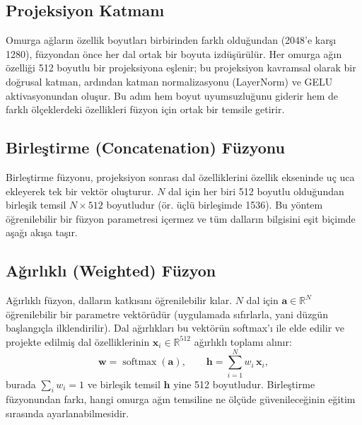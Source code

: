 \subsection{Projeksiyon Katmanı}
\label{subsec:projection}
Omurga ağların özellik boyutları birbirinden farklı olduğundan (2048'e karşı
1280), füzyondan önce her dal ortak bir boyuta izdüşürülür. Her omurga ağın
özelliği 512 boyutlu bir projeksiyona eşlenir; bu projeksiyon kavramsal olarak
bir doğrusal katman, ardından katman normalizasyonu (LayerNorm) ve GELU
aktivasyonundan oluşur. Bu adım hem boyut uyumsuzluğunu giderir
hem de farklı ölçeklerdeki özellikleri füzyon için ortak bir temsile getirir.

\subsection{Birleştirme (Concatenation) Füzyonu}
\label{subsec:concat}
Birleştirme füzyonu, projeksiyon sonrası dal özelliklerini özellik ekseninde
uç uca ekleyerek tek bir vektör oluşturur. $N$ dal için her biri 512 boyutlu
olduğundan birleşik temsil $N\times512$ boyutludur (ör. üçlü birleşimde 1536).
Bu yöntem öğrenilebilir bir füzyon parametresi içermez ve tüm dalların bilgisini
eşit biçimde aşağı akışa taşır.

\subsection{Ağırlıklı (Weighted) Füzyon}
\label{subsec:weighted}
Ağırlıklı füzyon, dalların katkısını öğrenilebilir kılar. $N$ dal için
$\mathbf{a}\in\mathbb{R}^{N}$ öğrenilebilir bir parametre vektörüdür (uygulamada
sıfırlarla, yani düzgün başlangıçla ilklendirilir). Dal ağırlıkları bu vektörün
softmax'ı ile elde edilir ve projekte edilmiş dal özelliklerinin
$\mathbf{x}_i\in\mathbb{R}^{512}$ ağırlıklı toplamı alınır:
\begin{equation}
  \mathbf{w} = \operatorname{softmax}(\mathbf{a}), \qquad
  \mathbf{h} = \sum_{i=1}^{N} w_i\,\mathbf{x}_i ,
\end{equation}
burada $\sum_i w_i = 1$ ve birleşik temsil $\mathbf{h}$ yine 512 boyutludur.
Birleştirme füzyonundan farkı, hangi omurga ağın temsiline ne ölçüde
güvenileceğinin eğitim sırasında ayarlanabilmesidir.

